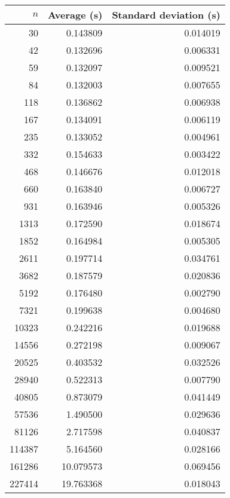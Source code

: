 \begin{tabular}{rrr}
$n$ & Average (s) & Standard deviation (s) \\\hline
30 & 0.143809 & 0.014019\\ 
42 & 0.132696 & 0.006331\\ 
59 & 0.132097 & 0.009521\\ 
84 & 0.132003 & 0.007655\\ 
118 & 0.136862 & 0.006938\\ 
167 & 0.134091 & 0.006119\\ 
235 & 0.133052 & 0.004961\\ 
332 & 0.154633 & 0.003422\\ 
468 & 0.146676 & 0.012018\\ 
660 & 0.163840 & 0.006727\\ 
931 & 0.163946 & 0.005326\\ 
1313 & 0.172590 & 0.018674\\ 
1852 & 0.164984 & 0.005305\\ 
2611 & 0.197714 & 0.034761\\ 
3682 & 0.187579 & 0.020836\\ 
5192 & 0.176480 & 0.002790\\ 
7321 & 0.199638 & 0.004680\\ 
10323 & 0.242216 & 0.019688\\ 
14556 & 0.272198 & 0.009067\\ 
20525 & 0.403532 & 0.032526\\ 
28940 & 0.522313 & 0.007790\\ 
40805 & 0.873079 & 0.041449\\ 
57536 & 1.490500 & 0.029636\\ 
81126 & 2.717598 & 0.040837\\ 
114387 & 5.164560 & 0.028166\\ 
161286 & 10.079573 & 0.069456\\ 
227414 & 19.763368 & 0.018043\\ 
\end{tabular}
